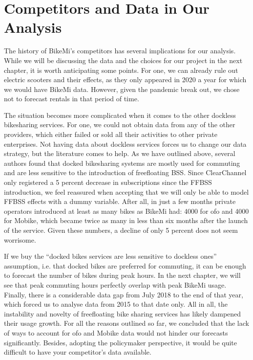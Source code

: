 \documentclass[letterpaper,10pt,english]{jupyterBook}
\begin{document}
\section{Competitors and Data in Our Analysis}
\label{\detokenize{02-bikesharing_and_bikemi:competitors-and-data-in-our-analysis}}
\sphinxAtStartPar
The history of BikeMi’s competitors has several implications for our analysis. While we will be discussing the data and the choices for our project in the next chapter, it is worth anticipating some points. For one, we can already rule out electric scooters and their effects, as they only appeared in 2020 \sphinxhyphen{} a year for which we would have BikeMi data. However, given the pandemic break out, we chose not to forecast rentals in that period of time.

\sphinxAtStartPar
The situation becomes more complicated when it comes to the other dockless bike\sphinxhyphen{}sharing services. For one, we could not obtain data from any of the other providers, which either failed or sold all their activities to other private enterprises. Not having data about dockless services forces us to change our data strategy, but the literature comes to help. As we have outlined above, several authors found that docked bike\sphinxhyphen{}sharing systems are mostly used for commuting and are less sensitive to the introduction of free\sphinxhyphen{}floating BSS. Since ClearChannel only registered a 5 percent decrease in subscriptions since the FFBSS introduction, we feel reassured when accepting that we will only be able to model FFBSS effects with a dummy variable. After all, in just a few months private operators introduced at least as many bikes as BikeMi had: 4000 for ofo and 4000 for Mobike, which became twice as many in less than six months after the launch of the service. Given these numbers, a decline of only 5 percent does not seem worrisome.

\sphinxAtStartPar
If we buy the “docked bikes services are less sensitive to dockless ones” assumption, i.e. that docked bikes are preferred for commuting, it can be enough to forecast the number of bikes during peak hours. In the next chapter, we will see that peak commuting hours perfectly overlap with peak BikeMi usage. Finally, there is a considerable data gap from July 2018 to the end of that year, which forced us to analyse data from 2015 to that date only. All in all, the instability and novelty of free\sphinxhyphen{}floating bike sharing services has likely dampened their usage growth. For all the reasons outlined so far, we concluded that the lack of ways to account for ofo and Mobike data would not hinder our forecasts significantly. Besides, adopting the policymaker perspective, it would be quite difficult to have your competitor’s data available.
\end{document}

